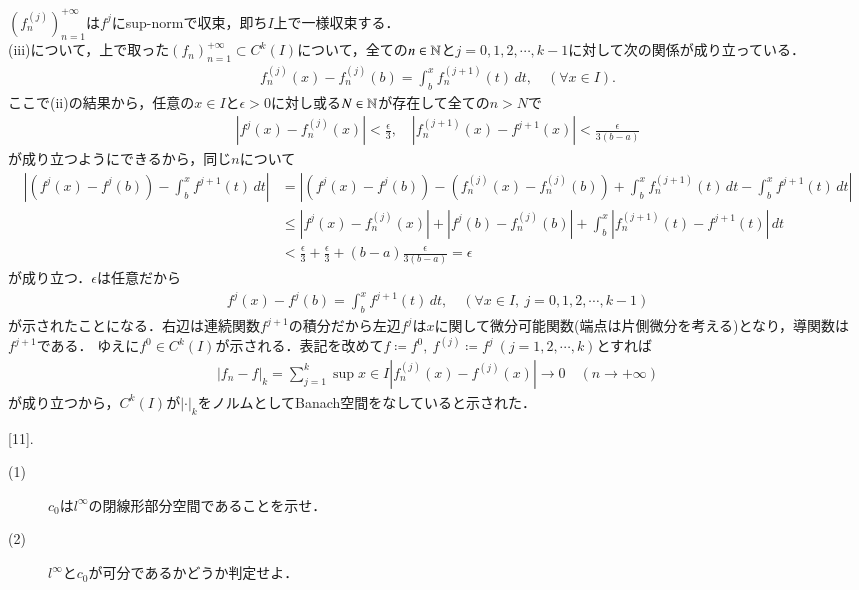 \begin{prf}
	$(f_n^{(j)})_{n=1}^{+\infty}$は$f^j$にsup-normで収束，即ち$I$上で一様収束する．\\
	(iii)について，上で取った$(f_n)_{n=1}^{+\infty} \subset C^k(I)$について，全ての$n \in \mathbb{N}$と$j = 0,1,2,\cdots,k-1$に対して次の関係が成り立っている．
	\begin{align}
		f_n^{(j)}(x) - f_n^{(j)}(b) = \int_{b}^{x} f_n^{(j+1)}(t)\, dt, \quad (\forall x \in I).
	\end{align}
	ここで(ii)の結果から，任意の$x \in I$と$\epsilon > 0$に対し或る$N \in \mathbb{N}$が存在して全ての$n > N$で
	\begin{align}
		\left|f^j(x) - f_n^{(j)}(x)\right| < \frac{\epsilon}{3},\quad \left|f_n^{(j+1)}(x) - f^{j+1}(x)\right| < \frac{\epsilon}{3(b-a)}
	\end{align}
	が成り立つようにできるから，同じ$n$について
	\begin{align}
		\left|(f^j(x) - f^j(b)) - \int_{b}^{x} f^{j+1}(t)\, dt\right| 
		&= \left|(f^j(x) - f^j(b)) - (f_n^{(j)}(x) - f_n^{(j)}(b))
			+ \int_{b}^{x} f_n^{(j+1)}(t)\, dt - \int_{b}^{x} f^{j+1}(t)\, dt\right| \\
		&\leq \left|f^j(x) - f_n^{(j)}(x)\right| + \left|f^j(b) - f_n^{(j)}(b)\right| 
			+ \int_{b}^{x} \left| f_n^{(j+1)}(t) - f^{j+1}(t) \right|\, dt \\
		&< \frac{\epsilon}{3} + \frac{\epsilon}{3} + (b-a) \frac{\epsilon}{3(b-a)} = \epsilon
 	\end{align}
 	が成り立つ．$\epsilon$は任意だから
 	\begin{align}
 		f^j(x) - f^j(b) = \int_{b}^{x} f^{j+1}(t)\, dt, \quad (\forall x \in I,\ j=0,1,2,\cdots,k-1)
 	\end{align}
 	が示されたことになる．右辺は連続関数$f^{j+1}$の積分だから左辺$f^j$は$x$に関して微分可能関数(端点は片側微分を考える)となり，導関数は$f^{j+1}$である．
 	ゆえに$f^0 \in C^k(I)$が示される．表記を改めて$f \coloneqq f^0,\ f^{(j)} \coloneqq f^j\ (j=1,2,\cdots,k)$とすれば
 	\begin{align}
 		|f_n - f|_k = \sum_{j=1}^{k}\sup{x \in I}{\left|f_n^{(j)}(x) - f^{(j)}(x)\right|} \longrightarrow 0\quad (n \rightarrow +\infty)
 	\end{align}
 	が成り立つから，$C^k(I)$が$|\cdot|_k$をノルムとしてBanach空間をなしていると示された．
 	\QED
\end{prf}

[11].\ 
	\begin{description}
		\item[(1)] $c_0$は$l^{\infty}$の閉線形部分空間であることを示せ．
		\item[(2)] $l^{\infty}$と$c_0$が可分であるかどうか判定せよ．
	\end{description}
	

